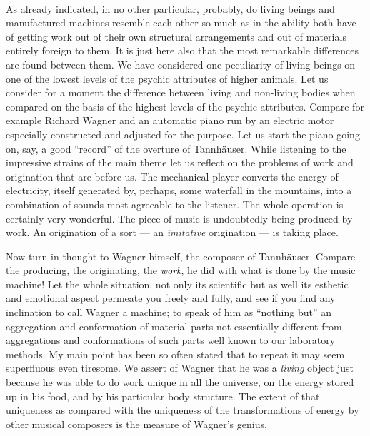 \documentclass[a4paper, 11pt, oneside, polutonikogreek, english, landscape]{article}
\begin{document}
\paragraph{}
As already indicated, in no other particular, probably, do living beings and manufactured machines resemble each other so much as in the ability both have of getting work out of their own structural arrangements and out of materials entirely foreign to them. It is just here also that the most remarkable differences are found between them. We have considered one peculiarity of living beings on one of the lowest levels of the psychic attributes of higher animals. Let us consider for a moment the difference between living and non-living bodies when compared on the basis of the highest levels of the psychic attributes. Compare for example Richard Wagner and an automatic piano run by an electric motor especially constructed and adjusted for the purpose. Let us start the piano going on, say, a good ``record'' of the overture of Tannhäuser. While listening to the impressive strains of the main theme let us reflect on the problems of work and origination that are before us. The mechanical player converts the energy of electricity, itself generated by, perhaps, some waterfall in the mountains, into a combination of sounds most agreeable to the listener. The whole operation is certainly very wonderful. The piece of music is undoubtedly being produced by work. An origination of a sort --- an \emph{imitative} origination --- is taking place.

Now turn in thought to Wagner himself, the composer of Tannhäuser. Compare the producing, the originating, the \emph{work}, he did with what is done by the music machine! Let the whole situation, not only its scientific but as well its esthetic and emotional aspect permeate you freely and fully, and see if you find any inclination to call Wagner a machine; to speak of him as ``nothing but'' an aggregation and conformation of material parts not essentially different from aggregations and conformations of such parts well known to our laboratory methods. My main point has been so often stated that to repeat it may seem superfluous even tiresome. We assert of Wagner that he was a \emph{living} object just because he was able to do work unique in all the universe, on the energy stored up in his food, and by his particular body structure. The extent of that uniqueness as compared with the uniqueness of the transformations of energy by other musical composers is the measure of Wagner's genius.
\end{document}
